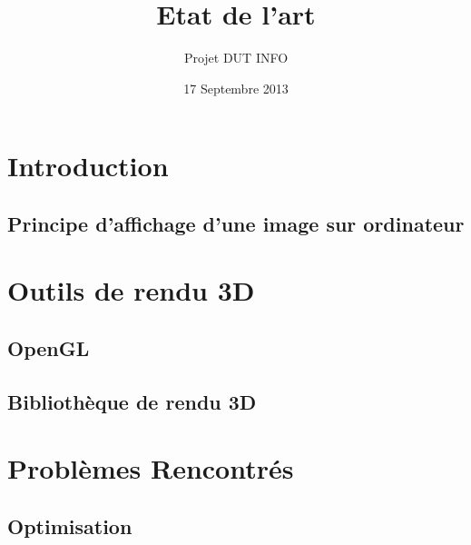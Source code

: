 \documentclass{report}
\title{Etat de l'art}
\author{Projet DUT INFO}
\date{17 Septembre 2013}
\begin{document}
\maketitle
\tableofcontents

\part{Introduction}

\chapter{Principe d'affichage d'une image sur ordinateur}


\part{Outils de rendu 3D}

\chapter{OpenGL}


\chapter{Bibliothèque de rendu 3D}


\part{Problèmes Rencontrés}

\chapter{Optimisation}
\newpage
\end{document}
